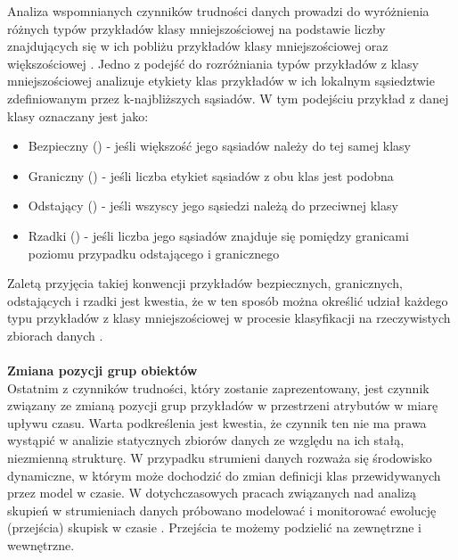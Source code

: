\noindent Analiza wspomnianych czynników trudności danych prowadzi do wyróżnienia różnych typów przykładów klasy mniejszościowej na podstawie liczby znajdujących się w ich pobliżu przykładów klasy mniejszościowej oraz większościowej \cite{Article:DataDistribution3}. Jedno z podejść do rozróżniania typów przykładów z klasy mniejszościowej \cite{Article:DataDistribution3}\cite{Article:DataDistribution2} analizuje etykiety klas przykładów w ich lokalnym sąsiedztwie zdefiniowanym przez k-najbliższych sąsiadów. W tym podejściu przykład z danej klasy oznaczany jest jako:

\begin{itemize}
    \item Bezpieczny () - jeśli większość jego sąsiadów należy do tej samej klasy
    \item Graniczny () - jeśli liczba etykiet sąsiadów z obu klas jest podobna
    \item Odstający () - jeśli wszyscy jego sąsiedzi należą do przeciwnej klasy
    \item Rzadki () - jeśli liczba jego sąsiadów znajduje się pomiędzy granicami poziomu przypadku odstającego i granicznego
\end{itemize}

\noindent Zaletą przyjęcia takiej konwencji przykładów bezpiecznych, granicznych, odstających i rzadki jest kwestia, że w ten sposób można określić udział każdego typu przykładów z klasy mniejszościowej w procesie klasyfikacji na rzeczywistych zbiorach danych \cite{Article:TypyPrzykladow}\cite{Article:DataDistribution3}\cite{Article:DataDistribution2}.\\\\
\textbf{Zmiana pozycji grup obiektów}\\

\noindent Ostatnim z czynników trudności, który zostanie zaprezentowany, jest czynnik związany ze zmianą pozycji grup przykładów w przestrzeni atrybutów w miarę upływu czasu. Warta podkreślenia jest kwestia, że czynnik ten nie ma prawa wystąpić w analizie statycznych zbiorów danych ze względu na ich stałą, niezmienną strukturę. W przypadku strumieni danych rozważa się środowisko dynamiczne, w którym może dochodzić do zmian definicji klas przewidywanych przez model w czasie. W dotychczasowych pracach związanych nad analizą skupień w strumieniach danych próbowano modelować i monitorować ewolucję (przejścia) skupisk w czasie \cite{Article:ClusterTransition}. Przejścia te możemy podzielić na zewnętrzne i wewnętrzne.

